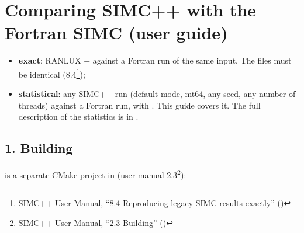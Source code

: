 \chapter{\texorpdfstring{Comparing SIMC++ with the Fortran SIMC (user guide)}{Comparing SIMC++ with the Fortran SIMC (user guide)}}\label{translation_report-useru5fcomparingu5fwithu5ffortran}
\begin{itemize}
\item \textbf{exact}: RANLUX +  against a Fortran run of the same input. The files must be identical
(8.4\footnote{SIMC++ User Manual, ``8.4 Reproducing legacy SIMC results exactly'' ()});
\item \textbf{statistical}: any SIMC++ run (default mode, mt64, any seed, any number of threads) against a Fortran run, with
. This guide covers it. The full description of the statistics is in .
\end{itemize}
\section*{\texorpdfstring{1. Building }{1. Building simc\_\allowbreak{}compare}}\label{translation_report-useru5fcomparingu5fwithu5ffortran:1-building-simcu5fcompare}
 is a separate CMake project in  (user manual 2.3\footnote{SIMC++ User Manual, ``2.3 Building'' ()}):

